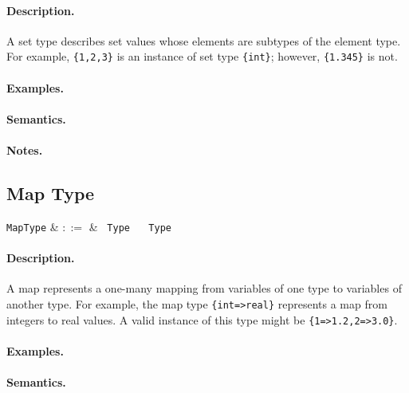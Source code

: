 \paragraph{Description.}  A set type describes set values whose
elements are subtypes of the element type. For example,
\lstinline|{1,2,3}| is an instance of set type \lstinline|{int}|;
however, \lstinline|{1.345}| is not.

\paragraph{Examples.}

\paragraph{Semantics.}

\paragraph{Notes.} 


\subsection{Map Type}

\begin{syntax}
  \verb+MapType+ & $::=$ & \token{\{} \ \verb+Type+ \ \token{=>} \ \verb+Type+ \ \token{\}} \\
\end{syntax}

\paragraph{Description.}  A map represents a one-many mapping from
variables of one type to variables of another type. For example, the
map type \lstinline|{int=>real}| represents a map from integers to real
values. A valid instance of this type might be \lstinline|{1=>1.2,2=>3.0}|.

\paragraph{Examples.}

\paragraph{Semantics.}

